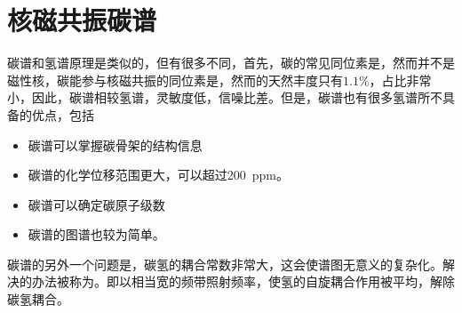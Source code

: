 \section{核磁共振碳谱}
碳谱和氢谱原理是类似的，但有很多不同，首先，碳的常见同位素是，然而并不是磁性核，碳能参与核磁共振的同位素是，然而的天然丰度只有$1.1\%$，占比非常小，因此，碳谱相较氢谱，灵敏度低，信噪比差。但是，碳谱也有很多氢谱所不具备的优点，包括
\begin{itemize}
    \item 碳谱可以掌握碳骨架的结构信息
    \item 碳谱的化学位移范围更大，可以超过\SI{200}{ppm}。
    \item 碳谱可以确定碳原子级数
    \item 碳谱的图谱也较为简单。
\end{itemize}
碳谱的另外一个问题是，碳氢的耦合常数非常大，这会使谱图无意义的复杂化。解决的办法被称为。即以相当宽的频带照射频率，使氢的自旋耦合作用被平均，解除碳氢耦合。